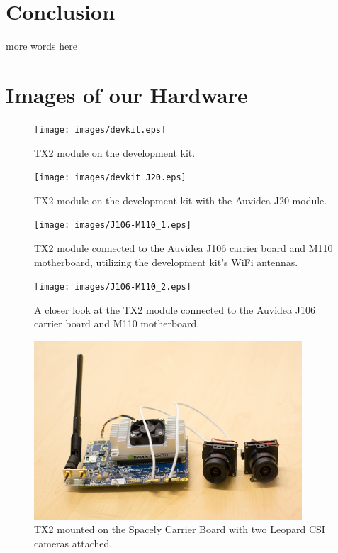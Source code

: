 \documentclass[letterpaper,10pt,serif,draftclsnofoot,onecolumn,compsoc,titlepage]{IEEEtran}
\begin{document}
\section{Conclusion}

more words here\\

\section{Images of our Hardware}

\begin{figure}[H]
	\centering
	\label{fig:TX2 module on the development kit.}
	\texttt{[image: images/devkit.eps]}
	\caption{TX2 module on the development kit. \label{overflow}}
\end{figure}


\begin{figure}[H]
	\centering
	\label{fig:TX2 module on the development kit with the Auvidea J20 module.}
	\texttt{[image: images/devkit\_J20.eps]}
	\caption{TX2 module on the development kit with the Auvidea J20 module. \label{overflow}}
\end{figure}


\begin{figure}[H]
	\centering
	\label{fig:TX2 module connected to the Auvidea J106 carrier board and M110 motherboard, utilizing the development kit's WiFi antennas.}
	\texttt{[image: images/J106-M110\_1.eps]}
	\caption{TX2 module connected to the Auvidea J106 carrier board and M110 motherboard, utilizing the development kit's WiFi antennas. \label{overflow}}
\end{figure}


\begin{figure}[H]
	\centering
	\label{fig:A closer look at the TX2 module connected to the Auvidea J106 carrier board and M110 motherboard.}
	\texttt{[image: images/J106-M110\_2.eps]}
	\caption{A closer look at the TX2 module connected to the Auvidea J106 carrier board and M110 motherboard. \label{overflow}}
\end{figure}

\begin{figure}[H]
	\centering
	\label{fig:TX2 mounted on the Spacely Carrier Board with two CSI cameras attached.}
	\includegraphics[width=10cm]{images/spacely.eps}
	\caption{TX2 mounted on the Spacely Carrier Board with two Leopard CSI cameras attached. \label{overflow}}
\end{figure}

%
%
\end{document}
